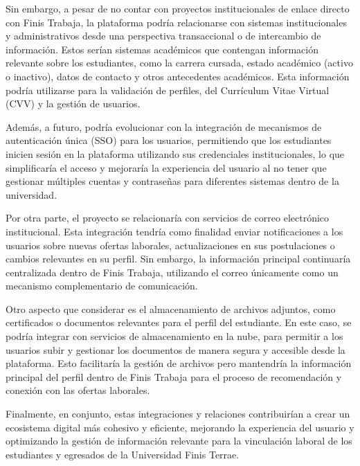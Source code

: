 \documentclass[11pt,a4paper]{Plantilla}
\begin{document}
Sin embargo, a pesar de no contar con proyectos institucionales de enlace directo con Finis Trabaja, la plataforma podría relacionarse con sistemas institucionales y administrativos desde una perspectiva transaccional o de intercambio de información. Estos serían sistemas académicos que contengan información relevante sobre los estudiantes, como la carrera cursada, estado académico (activo o inactivo), datos de contacto y otros antecedentes académicos. Esta información podría utilizarse para la validación de perfiles, del Currículum Vitae Virtual (CVV) y la gestión de usuarios.

\vspace{5pt}

Además, a futuro, podría evolucionar con la integración de mecanismos de autenticación única (SSO) para los usuarios, permitiendo que los estudiantes inicien sesión en la plataforma utilizando sus credenciales institucionales, lo que simplificaría el acceso y mejoraría la experiencia del usuario al no tener que gestionar múltiples cuentas y contraseñas para diferentes sistemas dentro de la universidad.

\vspace{5pt}

Por otra parte, el proyecto se relacionaría con servicios de correo electrónico institucional. Esta integración tendría como finalidad enviar notificaciones a los usuarios sobre nuevas ofertas laborales, actualizaciones en sus postulaciones o cambios relevantes en su perfil. Sin embargo, la información principal continuaría centralizada dentro de Finis Trabaja, utilizando el correo únicamente como un mecanismo complementario de comunicación.

\vspace{5pt}

Otro aspecto que considerar es el almacenamiento de archivos adjuntos, como certificados o documentos relevantes para el perfil del estudiante. En este caso, se podría integrar con servicios de almacenamiento en la nube, para permitir a los usuarios subir y gestionar los documentos de manera segura y accesible desde la plataforma. Esto facilitaría la gestión de archivos pero mantendría la información principal del perfil dentro de Finis Trabaja para el proceso de recomendación y conexión con las ofertas laborales.

\vspace{5pt}

Finalmente, en conjunto, estas integraciones y relaciones contribuirían a crear un ecosistema digital más cohesivo y eficiente, mejorando la experiencia del usuario y optimizando la gestión de información relevante para la vinculación laboral de los estudiantes y egresados de la Universidad Finis Terrae.
\end{document}
